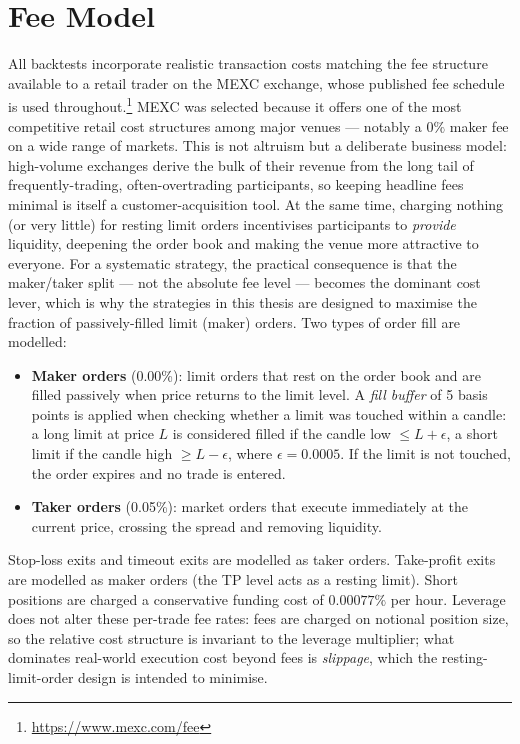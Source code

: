\section{Fee Model}
\label{sec:fee_model}

All backtests incorporate realistic transaction costs matching the fee structure available to a retail trader on the MEXC exchange, whose published fee schedule is used throughout.\footnote{\url{https://www.mexc.com/fee}} MEXC was selected because it offers one of the most competitive retail cost structures among major venues --- notably a $0\%$ maker fee on a wide range of markets. This is not altruism but a deliberate business model: high-volume exchanges derive the bulk of their revenue from the long tail of frequently-trading, often-overtrading participants, so keeping headline fees minimal is itself a customer-acquisition tool. At the same time, charging nothing (or very little) for resting limit orders incentivises participants to \textit{provide} liquidity, deepening the order book and making the venue more attractive to everyone. For a systematic strategy, the practical consequence is that the maker/taker split --- not the absolute fee level --- becomes the dominant cost lever, which is why the strategies in this thesis are designed to maximise the fraction of passively-filled limit (maker) orders. Two types of order fill are modelled:

\begin{itemize}
    \item \textbf{Maker orders} (0.00\%): limit orders that rest on the order book and are filled passively when price returns to the limit level. A \textit{fill buffer} of 5 basis points is applied when checking whether a limit was touched within a candle: a long limit at price $L$ is considered filled if the candle low $\leq L + \epsilon$, a short limit if the candle high $\geq L - \epsilon$, where $\epsilon = 0.0005$. If the limit is not touched, the order expires and no trade is entered.
    \item \textbf{Taker orders} (0.05\%): market orders that execute immediately at the current price, crossing the spread and removing liquidity.
\end{itemize}

\noindent Stop-loss exits and timeout exits are modelled as taker orders. Take-profit exits are modelled as maker orders (the TP level acts as a resting limit). Short positions are charged a conservative funding cost of $0.00077\%$ per hour. Leverage does not alter these per-trade fee rates: fees are charged on notional position size, so the relative cost structure is invariant to the leverage multiplier; what dominates real-world execution cost beyond fees is \textit{slippage}, which the resting-limit-order design is intended to minimise.


